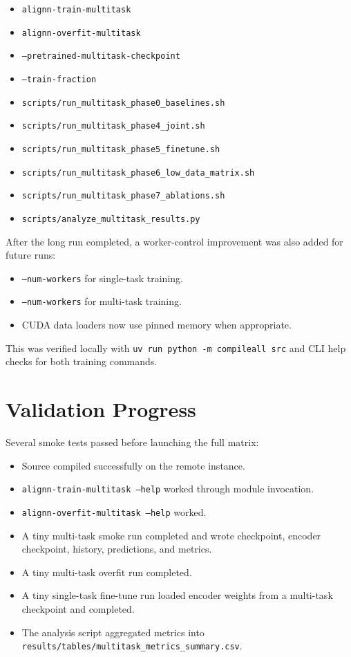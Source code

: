 \documentclass[11pt,a4paper]{article}
\begin{document}
\begin{itemize}
  \item \texttt{alignn-train-multitask}
  \item \texttt{alignn-overfit-multitask}
  \item \texttt{--pretrained-multitask-checkpoint}
  \item \texttt{--train-fraction}
  \item \texttt{scripts/run\_multitask\_phase0\_baselines.sh}
  \item \texttt{scripts/run\_multitask\_phase4\_joint.sh}
  \item \texttt{scripts/run\_multitask\_phase5\_finetune.sh}
  \item \texttt{scripts/run\_multitask\_phase6\_low\_data\_matrix.sh}
  \item \texttt{scripts/run\_multitask\_phase7\_ablations.sh}
  \item \texttt{scripts/analyze\_multitask\_results.py}
\end{itemize}

After the long run completed, a worker-control improvement was also added for future runs:

\begin{itemize}
  \item \texttt{--num-workers} for single-task training.
  \item \texttt{--num-workers} for multi-task training.
  \item CUDA data loaders now use pinned memory when appropriate.
\end{itemize}

This was verified locally with \texttt{uv run python -m compileall src} and CLI help checks for both training commands.

\section{Validation Progress}

Several smoke tests passed before launching the full matrix:

\begin{itemize}
  \item Source compiled successfully on the remote instance.
  \item \texttt{alignn-train-multitask --help} worked through module invocation.
  \item \texttt{alignn-overfit-multitask --help} worked.
  \item A tiny multi-task smoke run completed and wrote checkpoint, encoder checkpoint, history, predictions, and metrics.
  \item A tiny multi-task overfit run completed.
  \item A tiny single-task fine-tune run loaded encoder weights from a multi-task checkpoint and completed.
  \item The analysis script aggregated metrics into \texttt{results/tables/multitask\_metrics\_summary.csv}.
\end{itemize}
\end{document}
